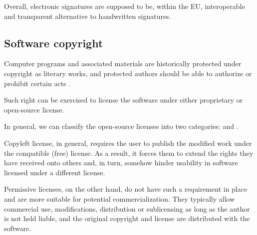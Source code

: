 \documentclass[thesismargins, english, thesislinespacing, onelinechapterstyle, upjsfrontpage]{rnthesis}
\begin{document}
Overall, electronic signatures are supposed to be, within the EU, interoperable and transparent alternative to handwritten signatures.

\subsection{Software copyright} \label{copyright}

Computer programs and associated materials are historically protected under copyright as literary works, and protected authors should be able to authorize or prohibit certain acts \cite{eeccopyright}.

Such right can be exercised to license the software under either proprietary or open-source license.
\iffalse %
Proprietary meaning under the exclusive legal right of the author, typically also confidential and distributed as a paid product.
Open-source meaning having its source code freely available, typically also distributed for free and without any liability (the software is provided "as is").

Motivation to license the software under an open-source license can differ, and so do such licenses.
While a proprietary license is usually made specifically for that entity and its interests, open-source licenses tend to be reused between different authors.
This means that consumers of the software can quickly recognize their rights and responsibilities if they decide to use, modify, or distribute the software.
\fi
In general, we can classify the open-source licenses into two categories:  and .

Copyleft license, in general, requires the user to publish the modified work under the compatible (free) license.
As a result, it forces them to extend the rights they have received onto others and, in turn, somehow hinder usability in software licensed under a different license.
\iffalse %
A popular example of such license is the GNU General Public License(GPL) and its derivatives like GNU Lesser GPL (LGPL) or GNU Affero GPL (AGPL).
\fi

Permissive licenses, on the other hand, do not have such a requirement in place and are more suitable for potential commercialization.
They typically allow commercial use, modifications, distribution or sublicensing as long as the author is not held liable, and the original copyright and license are distributed with the software.
\iffalse %
Often used permissive licenses are MIT License, Apache License, or BSD License.
\fi
\end{document}
